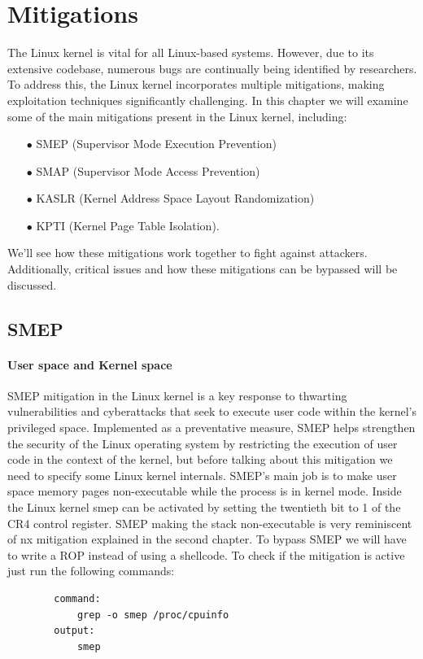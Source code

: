     \section{Mitigations}
    The Linux kernel is vital for all Linux-based systems. However, due to its extensive codebase, numerous bugs are continually being identified by researchers. To address this, the Linux kernel incorporates multiple mitigations, making exploitation techniques significantly challenging.\newline
    In this chapter we will examine some of the main mitigations present in the Linux kernel, including:
    \begin{itemize}
        \item[$\bullet$] SMEP (Supervisor Mode Execution Prevention)
        \item[$\bullet$] SMAP (Supervisor Mode Access Prevention) 
        \item[$\bullet$] KASLR (Kernel Address Space Layout Randomization)   
        \item[$\bullet$] KPTI (Kernel Page Table Isolation).\newline 
    \end{itemize}
    We'll see how these mitigations work together to fight against attackers.\newline
    Additionally, critical issues and how these mitigations can be bypassed will be discussed.\newline
    \subsection{SMEP}

    \paragraph{User space and Kernel space}

   SMEP mitigation in the Linux kernel is a key response to thwarting vulnerabilities and cyberattacks that seek to execute user code within the kernel's privileged space. Implemented as a preventative measure, SMEP helps strengthen the security of the Linux operating system by restricting the execution of user code in the context of the kernel, but before talking about this mitigation we need to specify some Linux kernel internals.\newline
    SMEP's main job is to make user space memory pages non-executable while the process is in kernel mode. Inside the Linux kernel smep can be activated by setting the twentieth bit to 1 of the CR4 control register.\newline
    SMEP making the stack non-executable is very reminiscent of nx mitigation explained in the second chapter.\newline
    To bypass SMEP we will have to write a ROP instead of using a shellcode.\newline 
    To check if the mitigation is active just run the following commands: \newline
        \begin{verbatim}
        command:
            grep -o smep /proc/cpuinfo
        output: 
            smep
    \end{verbatim}
